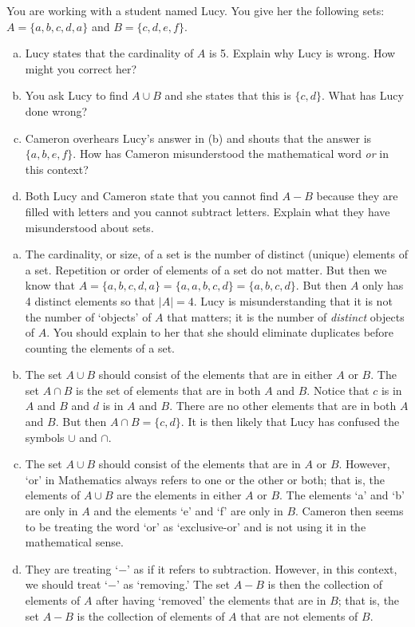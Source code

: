 \documentclass[11pt,letterpaper]{article}
\begin{document}
 You are working with a student named Lucy. You give her the following sets: $A= \{ a, b, c, d, a \}$ and $B= \{ c, d, e, f \}$. 
	\begin{enumerate}[(a)]
	\item Lucy states that the cardinality of $A$ is 5. Explain why Lucy is wrong. How might you correct her?
	\item You ask Lucy to find $A \cup B$ and she states that this is $\{ c, d \}$. What has Lucy done wrong?
	\item Cameron overhears Lucy's answer in (b) and shouts that the answer is $\{ a, b, e, f \}$. How has Cameron misunderstood the mathematical word \textit{or} in this context? 
	\item Both Lucy and Cameron state that you cannot find $A - B$ because they are filled with letters and you cannot subtract letters. Explain what they have misunderstood about sets. 
	\end{enumerate} \pspace

\sol 
\begin{enumerate}[(a)]
\item The cardinality, or size, of a set is the number of distinct (unique) elements of a set. Repetition or order of elements of a set do not matter. But then we know that $A= \{ a, b, c, d, a \}= \{ a, a, b, c, d \}= \{ a, b, c, d \}$. But then $A$ only has 4 distinct elements so that $|A|= 4$. Lucy is misunderstanding that it is not the number of `objects' of $A$ that matters; it is the number of \textit{distinct} objects of $A$. You should explain to her that she should eliminate duplicates before counting the elements of a set. \pspace

\item The set $A \cup B$ should consist of the elements that are in either $A$ or $B$. The set $A \cap B$ is the set of elements that are in both $A$ and $B$. Notice that $c$ is in $A$ and $B$ and $d$ is in $A$ and $B$. There are no other elements that are in both $A$ and $B$. But then $A \cap B= \{ c, d \}$. It is then likely that Lucy has confused the symbols $\cup$ and $\cap$. \pspace

\item The set $A \cup B$ should consist of the elements that are in $A$ or $B$. However, `or' in Mathematics always refers to one or the other or both; that is, the elements of $A \cup B$ are the elements in either $A$ or $B$. The elements `a' and `b' are only in $A$ and the elements `e' and `f' are only in $B$. Cameron then seems to be treating the word `or' as `exclusive-or' and is not using it in the mathematical sense. \pspace

\item They are treating `$-$' as if it refers to subtraction. However, in this context, we should treat `$-$' as `removing.' The set $A - B$ is then the collection of elements of $A$ after having `removed' the elements that are in $B$; that is, the set $A - B$ is the collection of elements of $A$ that are not elements of $B$. 
\end{enumerate}
\end{document}
